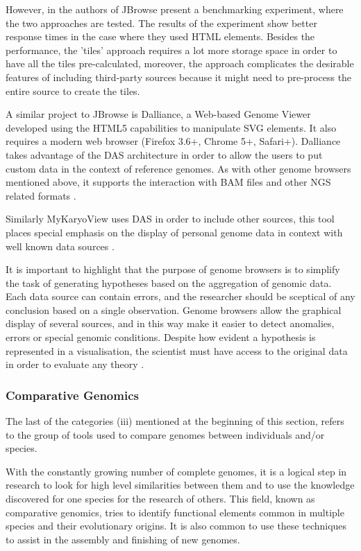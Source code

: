 However, in \cite{SKI2009} the authors of JBrowse present a benchmarking experiment, where the two approaches are tested. The results of the experiment show better response times in the case where they used HTML elements. Besides the performance, the 'tiles' approach requires a lot more storage space in order to have all the tiles pre-calculated, moreover, the approach complicates the desirable features of including third-party sources because it might need to pre-process the entire source to create the tiles.

A similar project to JBrowse is Dalliance, a Web-based Genome Viewer developed using the HTML5 capabilities to manipulate SVG elements. It also requires a modern web browser (Firefox 3.6+, Chrome 5+, Safari+). Dalliance takes advantage of the DAS architecture in order to allow the users to put custom data in the context of reference genomes. As with other genome browsers mentioned above, it supports the interaction with BAM files and other NGS related formats \cite{DOW2011}. 

Similarly MyKaryoView uses DAS in order to include other sources, this tool places special emphasis on the display of personal genome data in context with well known data sources \cite{JIM2011}.

It is important to highlight that the purpose of genome browsers is to simplify the task of generating hypotheses based on the aggregation of genomic data. Each data source can contain errors, and the researcher should be sceptical of any conclusion based on a single observation. Genome browsers allow the graphical display of several sources, and in this way make it easier to detect anomalies, errors or special genomic conditions. Despite how evident a hypothesis is represented in a visualisation, the scientist must have access to the original data in order to evaluate any theory \cite{CLI2009}.

\subsubsection{Comparative Genomics}
The last of the categories (iii) mentioned at the beginning of this section, refers to the group of tools used to compare genomes between individuals and/or species.

With the constantly growing number of complete genomes, it is a logical step in research to look for high level similarities between them and to use the knowledge discovered for one species for the research of others. This field, known as comparative genomics, tries to identify functional elements common in multiple species and their evolutionary origins. It is also common to use these techniques to assist in the assembly and finishing of new genomes.

